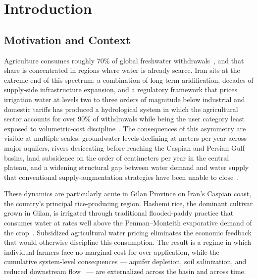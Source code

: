
\chapter{Introduction}
\label{chap:intro}

\section{Motivation and Context}
\label{sec:intro-motivation}

Agriculture consumes roughly 70\% of global freshwater
withdrawals~\cite{Sharma2025,Bayar2025}, and that share is concentrated
in regions where water is already scarce. Iran sits at the extreme end
of this spectrum: a combination of long-term aridification, decades of
supply-side infrastructure expansion, and a regulatory framework that
prices irrigation water at levels two to three orders of magnitude
below industrial and domestic tariffs has produced a hydrological
system in which the agricultural sector accounts for over 90\% of
withdrawals while being the user category least exposed to
volumetric-cost discipline~\cite{Mesgaran2018,Nouri2023,Behling2022}.
The consequences of this asymmetry are visible at multiple scales:
groundwater levels declining at meters per year across major aquifers,
rivers desiccating before reaching the Caspian and Persian Gulf
basins, land subsidence on the order of centimeters per year in the
central plateau, and a widening structural gap between water demand
and water supply that conventional supply-augmentation strategies have
been unable to close~\cite{PerezBlanco2020,Hajirad2025}.

These dynamics are particularly acute in Gilan Province on Iran's
Caspian coast, the country's principal rice-producing region. Hashemi
rice, the dominant cultivar grown in Gilan, is irrigated through
traditional flooded-paddy practice that consumes water at rates well
above the Penman--Monteith evaporative demand of the
crop~\cite{jalali2021,sadidi2021}. Subsidized agricultural water
pricing eliminates the economic feedback that would otherwise
discipline this consumption. The result is a regime in which
individual farmers face no marginal cost for over-application, while
the cumulative system-level consequences --- aquifer depletion, soil
salinization, and reduced downstream
flow~\cite{PourgholamAmiji2024,Behling2022} --- are externalized
across the basin and across time.

